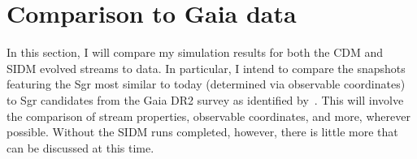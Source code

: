 \chapter{Comparison to Gaia data}
\label{sec:data}

In this section, I will compare my simulation results for both the CDM and SIDM
evolved streams to data. In particular, I intend to compare the snapshots
featuring the Sgr most similar to today (determined via observable coordinates)
to Sgr candidates from the Gaia DR2 survey as identified
by~\cite{ibata_panoramic_2020}. This will involve the comparison of stream
properties, observable coordinates, and more, wherever possible. Without the
SIDM runs completed, however, there is little more that can be discussed at this
time.

% 
